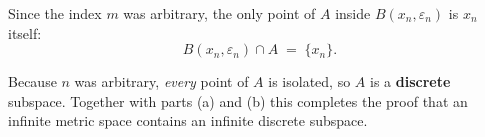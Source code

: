 \documentclass[12pt]{article}
\theoremstyle{definition} %
\theoremstyle{plain} %
\begin{document}
Since the index $m$ was arbitrary, the only point of $A$ inside
\(B(x_n,\varepsilon_n)\) is $x_n$ itself:
\[
    B(x_n,\varepsilon_n)\cap A \;=\;\{x_n\}.
\]

Because $n$ was arbitrary, \emph{every} point of $A$ is isolated, so $A$ is
a \textbf{discrete} subspace.  Together with parts (a) and (b) this completes
the proof that an infinite metric space contains an infinite discrete
subspace.
\end{document}
